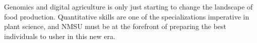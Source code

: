 \documentclass[11pt]{article}
\begin{document}



\medskip

Genomics and digital agriculture is only just starting to change the landscape of food production. Quantitative skills are one of the specializations imperative in plant science, and NMSU must be at the forefront of preparing the best individuals to usher in this new era.

\end{document}
